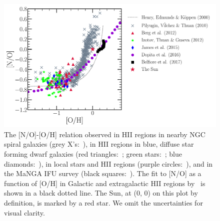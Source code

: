\documentclass[ms.tex]{subfiles}
\begin{document}
\begin{figure} 
\centering 
\includegraphics[scale = 0.5]{no_oh_observed.pdf} 
\caption{ 
The [N/O]-[O/H] relation observed in HII regions in nearby NGC spiral galaxies 
(grey X's:~\citealp*{Pilyugin2010}), in HII regions in blue, diffuse star 
forming dwarf galaxies (red triangles:~\citealp{Berg2012}; 
green stars:~\citealp*{Izotov2012}; blue diamonds:~\citealp{James2015}), in 
local stars and HII regions (purple circles:~\citealp{Dopita2016}), and in the 
MaNGA IFU survey (black squares:~\citealp{Belfiore2017}). 
The fit to [N/O] as a function of [O/H] in Galactic and extragalactic HII 
regions by~\citet*{Henry2000} is shown in a black dotted line. 
The Sun, at (0, 0) on this plot by definition, is marked by a red star. 
We omit the uncertainties for visual clarity. 
} 
\label{fig:no_oh_observed} 
\end{figure} 
\end{document}
